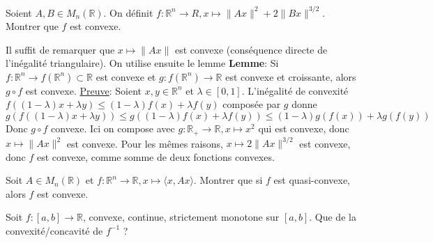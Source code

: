 \documentclass{fancybook}
\begin{document}
\begin{exercice}
Soient $A,B\in M_n(\mathbb R)$. On définit $f:\mathbb R^n\to R, x\mapsto \|Ax\|^2 + 2 \|Bx\|^{3/2}$. Montrer que $f$ est convexe.
\end{exercice}
Il suffit de remarquer que $x\mapsto \|Ax\|$ est convexe (conséquence directe de l'inégalité triangulaire). On utilise ensuite le lemme\newline
\textbf{Lemme}: Si $f:\mathbb R^n\to f(\mathbb R^n)\subset \mathbb R$ est convexe et $g:f(\mathbb R^n)\to \mathbb R$ est convexe et croissante, alors $g\circ f$ est convexe.\newline 
\underline{Preuve}: Soient $x,y\in \mathbb R^n$ et $\lambda \in [0,1]$. L'inégalité de convexité $f((1-\lambda)x+\lambda y)\leq (1-\lambda)f(x) + \lambda f(y)$ composée par $g$ donne $$g(f((1-\lambda)x+\lambda y)) \leq g((1-\lambda)f(x) + \lambda f(y))\leq (1-\lambda)g(f(x)) + \lambda g(f(y))$$
Donc $g\circ f$ convexe. \newline \newline
Ici on compose avec $g:\mathbb R_+\to \mathbb R, x\mapsto x^2 $ qui est convexe, donc $x\mapsto \|Ax\|^2$ est convexe.\newline
Pour les mêmes raisons, $x\mapsto 2\|Ax\|^{3/2}$ est convexe, donc $f$ est convexe, comme somme de deux fonctions convexes.

\begin{exercice}
Soit $A\in M_n(\mathbb R)$ et $f:\mathbb R^n\to \mathbb R, x\mapsto \langle x,Ax \rangle$. Montrer que si $f$ est quasi-convexe, alors $f$ est convexe.
\end{exercice}
\noindent

\begin{exercice}
Soit $f:[a,b]\to \mathbb R$, convexe, continue, strictement monotone sur $[a,b]$.\newline
Que de la convexité/concavité de $f^{-1}$ ?
\end{exercice}
\end{document}
